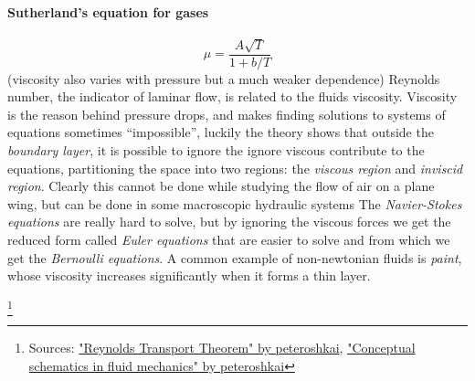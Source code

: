\begin{multicols}{3}
  \paragraph{\textbf{Sutherland's equation for gases}}
  \begin{equation*}
    \mu = \frac{A\sqrt{T}}{1 + b/T}
  \end{equation*}
  (viscosity also varies with pressure but a much weaker dependence)
  Reynolds number, the indicator of laminar flow, is related to the fluids viscosity.
  Viscosity is the reason behind pressure drops, and makes finding solutions to systems of equations sometimes ``impossible'',
  luckily the theory shows that outside the \textit{boundary layer}, it is possible to ignore the ignore viscous contribute
  to the equations, partitioning the space into two regions: the \textit{viscous region} and \textit{inviscid region}.
  Clearly this cannot be done while studying the flow of air on a plane wing, but can be done in some macroscopic hydraulic systems
  The \textit{Navier-Stokes equations} are really hard to solve, but by ignoring the viscous forces we get the
  reduced form called \textit{Euler equations} that are easier to solve and from which we get the \textit{Bernoulli equations}.
  A common example of non-newtonian fluids is \textit{paint}, whose viscosity increases significantly when it forms a thin layer.
\end{multicols}

\footnote{Sources:
  \href{https://youtu.be/aglUE8-TO-o?si=WT6Oy8Z-3LUYDyUw}{"Reynolds Transport Theorem" by peteroshkai},
  \href{https://youtu.be/B-ARVMoCu5M?si=_7e1dNTfakasU9mH}{"Conceptual schematics in fluid mechanics" by peteroshkai}
}

